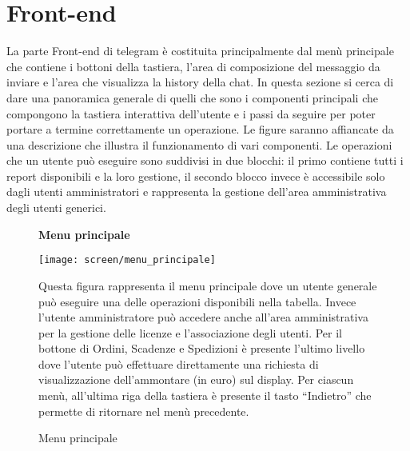 \clearpage
\section{Front-end}

La parte Front-end di telegram è costituita principalmente dal menù principale che contiene i bottoni della tastiera, l’area di composizione del messaggio da inviare e l’area che visualizza la history della chat. In questa sezione si cerca di dare una panoramica generale di quelli che sono i componenti principali che compongono la tastiera interattiva dell’utente e i passi da seguire per poter portare a termine correttamente un operazione. Le figure saranno affiancate da una descrizione che illustra il funzionamento di vari componenti. 
Le operazioni che un utente può eseguire sono suddivisi in due blocchi: il primo contiene tutti i report disponibili e la loro gestione, il secondo blocco invece è accessibile solo dagli utenti amministratori e rappresenta la gestione dell’area amministrativa degli utenti generici. \\


\begin{figure}[h!]
\begin{center} \textbf{Menu principale} \end{center}
\begin{center}
    \texttt{[image: screen/menu\_principale]} 
    \caption{Menu principale}
    \end{center}
Questa figura rappresenta il menu principale dove un utente generale può eseguire una delle operazioni disponibili nella tabella. Invece l’utente amministratore può accedere anche all’area amministrativa per la gestione delle licenze e l’associazione degli utenti. Per il bottone di Ordini, Scadenze e Spedizioni è presente l’ultimo livello dove l’utente può effettuare direttamente una richiesta di visualizzazione dell’ammontare (in euro) sul display. Per ciascun menù, all’ultima riga della tastiera è presente il tasto “Indietro” che permette di ritornare nel menù precedente. 
\end{figure}  




